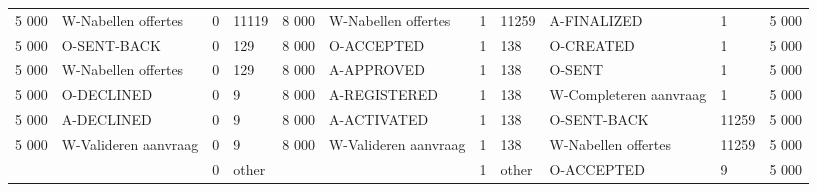 \begin{tabular}{llllllllllr}
5 000 & W-Nabellen offertes & 0 & 11119 & 8 000 & W-Nabellen offertes & 1 & 11259 & A-FINALIZED & 1 & 5 000 \\
5 000 & O-SENT-BACK & 0 & 129 & 8 000 & O-ACCEPTED & 1 & 138 & O-CREATED & 1 & 5 000 \\
5 000 & W-Nabellen offertes & 0 & 129 & 8 000 & A-APPROVED & 1 & 138 & O-SENT & 1 & 5 000 \\
5 000 & O-DECLINED & 0 & 9 & 8 000 & A-REGISTERED & 1 & 138 & W-Completeren aanvraag & 1 & 5 000 \\
5 000 & A-DECLINED & 0 & 9 & 8 000 & A-ACTIVATED & 1 & 138 & O-SENT-BACK & 11259 & 5 000 \\
5 000 & W-Valideren aanvraag & 0 & 9 & 8 000 & W-Valideren aanvraag & 1 & 138 & W-Nabellen offertes & 11259 & 5 000 \\
 &  & 0 & other &  &  & 1 & other & O-ACCEPTED & 9 & 5 000 \\
\bottomrule
\end{tabular}
